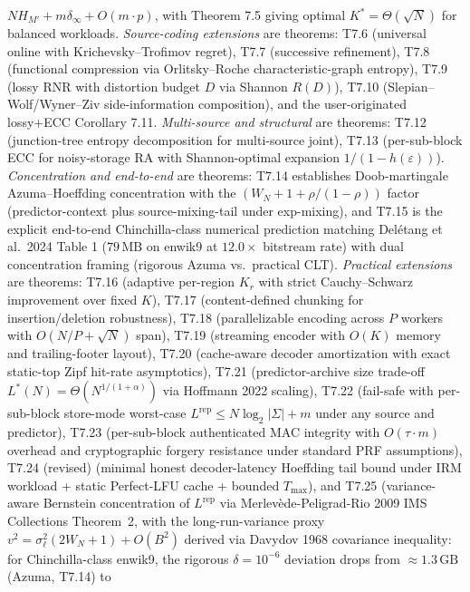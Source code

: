 \documentclass[
]{article}
\begin{document}
\begin{itemize}
  $N H_{M'} + m \delta_\infty + O(m \cdot p)$, with Theorem 7.5
  giving optimal $K^* = \Theta(\sqrt{N})$ for balanced workloads.
  \emph{Source-coding extensions} are theorems: T7.6 (universal
  online with Krichevsky--Trofimov regret), T7.7 (successive
  refinement), T7.8 (functional compression via Orlitsky--Roche
  characteristic-graph entropy), T7.9 (lossy RNR with distortion
  budget $D$ via Shannon $R(D)$), T7.10 (Slepian--Wolf/Wyner--Ziv
  side-information composition), and the user-originated lossy+ECC
  Corollary 7.11. \emph{Multi-source and structural} are theorems:
  T7.12 (junction-tree entropy decomposition for multi-source
  joint), T7.13 (per-sub-block ECC for noisy-storage RA with
  Shannon-optimal expansion $1/(1 - h(\varepsilon))$). \emph{Concentration
  and end-to-end} are theorems: T7.14 establishes Doob-martingale
  Azuma--Hoeffding concentration with the
  $(W_N + 1 + \rho/(1-\rho))$ factor (predictor-context plus
  source-mixing-tail under exp-mixing), and T7.15 is the explicit
  end-to-end Chinchilla-class numerical prediction matching
  Delétang et al.\ 2024 Table 1 ($79\,\mathrm{MB}$ on enwik9 at
  $12.0\times$ bitstream rate) with dual concentration framing
  (rigorous Azuma vs.\ practical CLT). \emph{Practical extensions}
  are theorems: T7.16 (adaptive per-region $K_r$ with strict
  Cauchy--Schwarz improvement over fixed $K$), T7.17
  (content-defined chunking for insertion/deletion robustness),
  T7.18 (parallelizable encoding across $P$ workers with
  $O(N/P + \sqrt{N})$ span), T7.19 (streaming encoder with $O(K)$
  memory and trailing-footer layout), T7.20 (cache-aware decoder
  amortization with exact static-top Zipf hit-rate asymptotics),
  T7.21 (predictor-archive size trade-off
  $L^*(N) = \Theta(N^{1/(1+\alpha)})$ via Hoffmann 2022 scaling),
  T7.22 (fail-safe with per-sub-block store-mode worst-case
  $L^{\mathrm{rep}} \leq N \log_2 |\Sigma| + m$ under any source
  and predictor), T7.23 (per-sub-block authenticated MAC integrity
  with $O(\tau \cdot m)$ overhead and cryptographic forgery
  resistance under standard PRF assumptions), T7.24 (revised)
  (minimal honest decoder-latency Hoeffding tail bound under IRM
  workload + static Perfect-LFU cache + bounded $T_{\max}$), and
  T7.25 (variance-aware Bernstein concentration of
  $L^{\mathrm{rep}}$ via Merlev\`ede-Peligrad-Rio 2009 IMS Collections
  Theorem~2, with the long-run-variance proxy $v^2 = \sigma_\ell^2
  (2W_N + 1) + O(B^2)$ derived via Davydov 1968 covariance inequality:
  for Chinchilla-class enwik9, the rigorous $\delta = 10^{-6}$
  deviation drops from $\approx 1.3\,\mathrm{GB}$ (Azuma, T7.14) to

\end{itemize}
\end{document}
